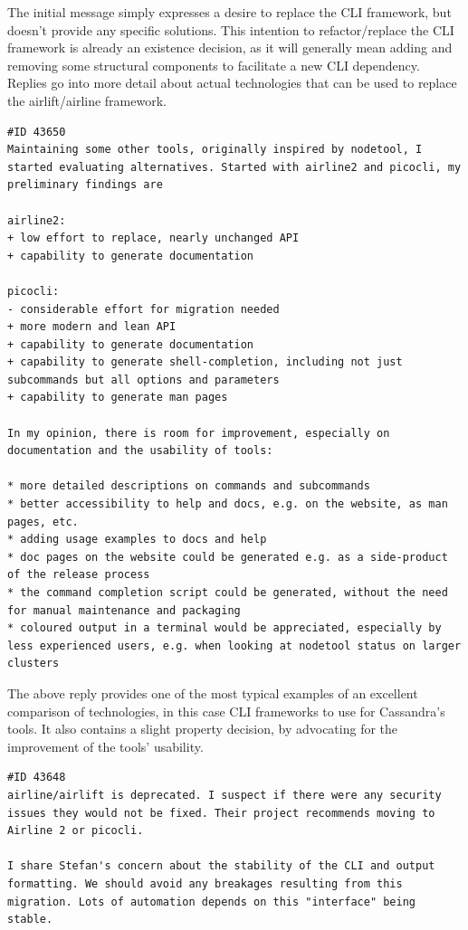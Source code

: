 \documentclass[a4paper, 12pt]{article}
\begin{document}
			The initial message simply expresses a desire to replace the CLI framework, but doesn't provide any specific solutions. This intention to refactor/replace the CLI framework is already an existence decision, as it will generally mean adding and removing some structural components to facilitate a new CLI dependency. Replies go into more detail about actual technologies that can be used to replace the airlift/airline framework.
		
			\begin{verbatim}
#ID 43650
Maintaining some other tools, originally inspired by nodetool, I started evaluating alternatives. Started with airline2 and picocli, my preliminary findings are

airline2:
+ low effort to replace, nearly unchanged API
+ capability to generate documentation

picocli:
- considerable effort for migration needed
+ more modern and lean API
+ capability to generate documentation
+ capability to generate shell-completion, including not just subcommands but all options and parameters
+ capability to generate man pages

In my opinion, there is room for improvement, especially on documentation and the usability of tools:

* more detailed descriptions on commands and subcommands
* better accessibility to help and docs, e.g. on the website, as man pages, etc.
* adding usage examples to docs and help
* doc pages on the website could be generated e.g. as a side-product of the release process
* the command completion script could be generated, without the need for manual maintenance and packaging
* coloured output in a terminal would be appreciated, especially by less experienced users, e.g. when looking at nodetool status on larger clusters
			\end{verbatim}
			
			The above reply provides one of the most typical examples of an excellent comparison of technologies, in this case CLI frameworks to use for Cassandra's tools. It also contains a slight property decision, by advocating for the improvement of the tools' usability.
		
			\begin{verbatim}
#ID 43648
airline/airlift is deprecated. I suspect if there were any security issues they would not be fixed. Their project recommends moving to Airline 2 or picocli.

I share Stefan's concern about the stability of the CLI and output formatting. We should avoid any breakages resulting from this migration. Lots of automation depends on this "interface" being stable.
			\end{verbatim}
		
\end{document}
